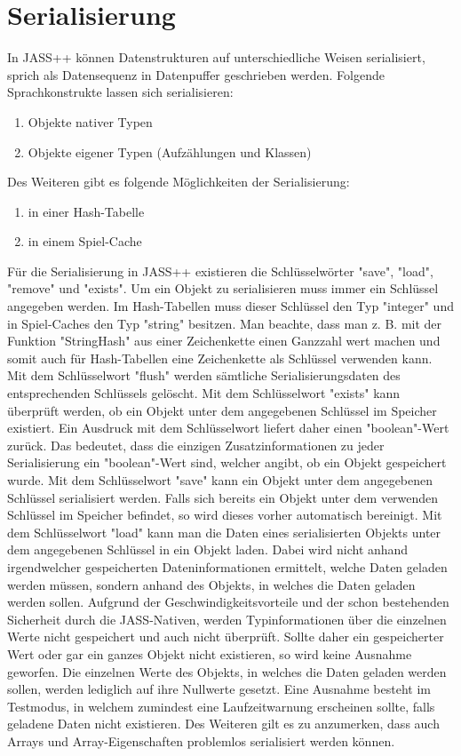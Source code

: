 \chapter{Serialisierung}
In JASS++ können Datenstrukturen auf unterschiedliche Weisen serialisiert, sprich als Datensequenz in Datenpuffer geschrieben werden.
Folgende Sprachkonstrukte lassen sich serialisieren:
\begin{enumerate}
\item Objekte nativer Typen
\item Objekte eigener Typen (Aufzählungen und Klassen)
\end{enumerate}

Des Weiteren gibt es folgende Möglichkeiten der Serialisierung:
\begin{enumerate}
\item in einer Hash-Tabelle
\item in einem Spiel-Cache
\end{enumerate}

Für die Serialisierung in JASS++ existieren die Schlüsselwörter "save", "load", "remove" und "exists".
Um ein Objekt zu serialisieren muss immer ein Schlüssel angegeben werden. Im Hash-Tabellen muss dieser Schlüssel den Typ "integer" und in Spiel-Caches den Typ "string" besitzen.
Man beachte, dass man z. B. mit der Funktion "StringHash" aus einer Zeichenkette einen Ganzzahl wert machen und somit auch für Hash-Tabellen eine Zeichenkette als Schlüssel verwenden kann.
Mit dem Schlüsselwort "flush" werden sämtliche Serialisierungsdaten des entsprechenden Schlüssels gelöscht.
Mit dem Schlüsselwort "exists" kann überprüft werden, ob ein Objekt unter dem angegebenen Schlüssel im Speicher existiert. Ein Ausdruck mit dem Schlüsselwort liefert daher einen "boolean"-Wert zurück.
Das bedeutet, dass die einzigen Zusatzinformationen zu jeder Serialisierung ein "boolean"-Wert sind, welcher angibt, ob ein Objekt gespeichert wurde.
Mit dem Schlüsselwort "save" kann ein Objekt unter dem angegebenen Schlüssel serialisiert werden. Falls sich bereits ein Objekt unter dem verwenden Schlüssel im Speicher befindet, so wird dieses vorher automatisch bereinigt.
Mit dem Schlüsselwort "load" kann man die Daten eines serialisierten Objekts unter dem angegebenen Schlüssel in ein Objekt laden.
Dabei wird nicht anhand irgendwelcher gespeicherten Dateninformationen ermittelt, welche Daten geladen werden müssen, sondern anhand des Objekts, in welches die Daten geladen werden sollen.
Aufgrund der Geschwindigkeitsvorteile und der schon bestehenden Sicherheit durch die JASS-Nativen, werden Typinformationen über die einzelnen Werte nicht gespeichert und auch nicht überprüft.
Sollte daher ein gespeicherter Wert oder gar ein ganzes Objekt nicht existieren, so wird keine Ausnahme geworfen.
Die einzelnen Werte des Objekts, in welches die Daten geladen werden sollen, werden lediglich auf ihre Nullwerte gesetzt.
Eine Ausnahme besteht im Testmodus, in welchem zumindest eine Laufzeitwarnung erscheinen sollte, falls geladene Daten nicht existieren.
Des Weiteren gilt es zu anzumerken, dass auch Arrays und Array-Eigenschaften problemlos serialisiert werden können.

